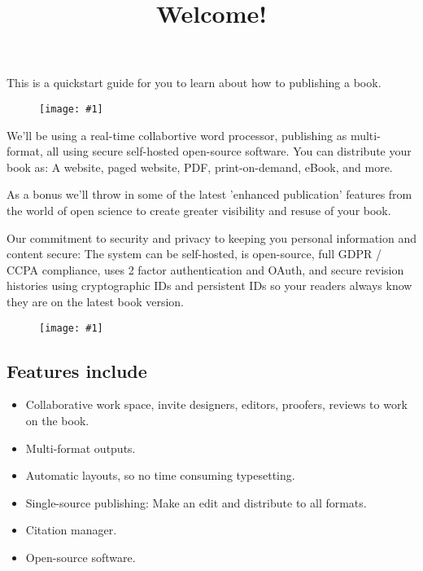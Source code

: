 \documentclass{article}
\newlength{\imgwidth}
\newcommand\scaledgraphics[2]{%
                
\settowidth{\imgwidth}{\texttt{[image: \#1]}}%
                
\setlength{\imgwidth}{\minof{\imgwidth}{#2\textwidth}}%
                
\texttt{[image: \#1]}%
                
}
\begin{document}
\title{Welcome!}

\maketitle


This is a quickstart guide for you to learn about how to publishing a book.

\begin{figure}
\scaledgraphics{b3bc6ba5-db38-4ec8-89db-45c029fdb485.png}{1}
\label{F98934631}
\end{figure}


We'll be using a real-time collabortive word processor, publishing as multi-format, all using secure self-hosted open-source software. You can distribute your book as: A website, paged website, PDF, print-on-demand, eBook, and more.


As a bonus we'll throw in some of the latest 'enhanced publication' features from the world of open science to create greater visibility and resuse of your book.


Our commitment to security and privacy to keeping you personal information and content secure: The system can be self-hosted, is open-source, full GDPR / CCPA compliance, uses 2 factor authentication and OAuth, and secure revision histories using cryptographic IDs and persistent IDs so your readers always know they are on the latest book version. 

\begin{figure}
\scaledgraphics{60a0cd01-c4e1-467e-a517-a5ae77dbbbaf.png}{0.5}
\label{F45597451}
\end{figure}


\subsection{Features include}\label{H2087393}


\begin{itemize}
\item Collaborative work space, invite designers, editors, proofers, reviews to work on the book.


\item Multi-format outputs.


\item Automatic layouts, so no time consuming typesetting.


\item Single-source publishing: Make an edit and distribute to all formats.


\item Citation manager.


\item Open-source software.


\end{itemize}
\end{document}
